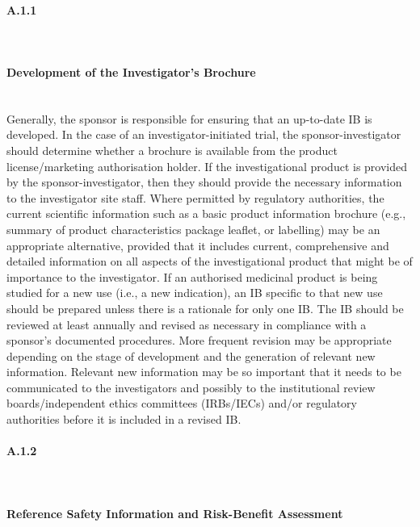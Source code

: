\documentclass[11pt]{article}
\begin{document}
\paragraph{A.1.1}\mbox{}\\

\paragraph{Development of the Investigator's Brochure}\mbox{}\\

Generally, the sponsor is responsible for ensuring that an up-to-date IB is developed. In the case of an investigator-initiated trial, the sponsor-investigator should determine whether a brochure is available from the product license/marketing authorisation holder. If the investigational product is provided by the sponsor-investigator, then they should provide the necessary information to the investigator site staff. Where permitted by regulatory authorities, the current scientific information such as a basic product information brochure (e.g., summary of product characteristics package leaflet, or labelling) may be an appropriate alternative, provided that it includes current, comprehensive and detailed information on all aspects of the investigational product that might be of importance to the investigator. If an authorised medicinal product is being studied for a new use (i.e., a new indication), an IB specific to that new use should be prepared unless there is a rationale for only one IB. The IB should be reviewed at least annually and revised as necessary in compliance with a sponsor's documented procedures. More frequent revision may be appropriate depending on the stage of development and the generation of relevant new information. Relevant new information may be so important that it needs to be communicated to the investigators and possibly to the institutional review boards/independent ethics committees (IRBs/IECs) and/or regulatory authorities before it is included in a revised IB.


\paragraph{A.1.2}\mbox{}\\

\paragraph{Reference Safety Information and Risk-Benefit Assessment}\mbox{}\\
\end{document}
